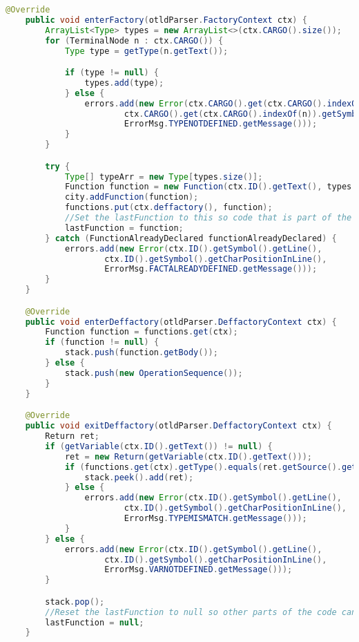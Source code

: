 \begin{landscape}
\begin{lstlisting}[language=Java]
    @Override
    public void enterFactory(otldParser.FactoryContext ctx) {
        ArrayList<Type> types = new ArrayList<>(ctx.CARGO().size());
        for (TerminalNode n : ctx.CARGO()) {
            Type type = getType(n.getText());

            if (type != null) {
                types.add(type);
            } else {
                errors.add(new Error(ctx.CARGO().get(ctx.CARGO().indexOf(n)).getSymbol().getLine(),
                        ctx.CARGO().get(ctx.CARGO().indexOf(n)).getSymbol().getCharPositionInLine(),
                        ErrorMsg.TYPENOTDEFINED.getMessage()));
            }
        }

        try {
            Type[] typeArr = new Type[types.size()];
            Function function = new Function(ctx.ID().getText(), types.toArray(typeArr));
            city.addFunction(function);
            functions.put(ctx.deffactory(), function);
            //Set the lastFunction to this so code that is part of the factory body can access it's platforms
            lastFunction = function;
        } catch (FunctionAlreadyDeclared functionAlreadyDeclared) {
            errors.add(new Error(ctx.ID().getSymbol().getLine(),
                    ctx.ID().getSymbol().getCharPositionInLine(),
                    ErrorMsg.FACTALREADYDEFINED.getMessage()));
        }
    }

    @Override
    public void enterDeffactory(otldParser.DeffactoryContext ctx) {
        Function function = functions.get(ctx);
        if (function != null) {
            stack.push(function.getBody());
        } else {
            stack.push(new OperationSequence());
        }
    }

    @Override
    public void exitDeffactory(otldParser.DeffactoryContext ctx) {
        Return ret;
        if (getVariable(ctx.ID().getText()) != null) {
            ret = new Return(getVariable(ctx.ID().getText()));
            if (functions.get(ctx).getType().equals(ret.getSource().getType())) {
                stack.peek().add(ret);
            } else {
                errors.add(new Error(ctx.ID().getSymbol().getLine(),
                        ctx.ID().getSymbol().getCharPositionInLine(),
                        ErrorMsg.TYPEMISMATCH.getMessage()));
            }
        } else {
            errors.add(new Error(ctx.ID().getSymbol().getLine(),
                    ctx.ID().getSymbol().getCharPositionInLine(),
                    ErrorMsg.VARNOTDEFINED.getMessage()));
        }

        stack.pop();
        //Reset the lastFunction to null so other parts of the code cannot access platforms
        lastFunction = null;
    }


\end{lstlisting}
\end{landscape}
